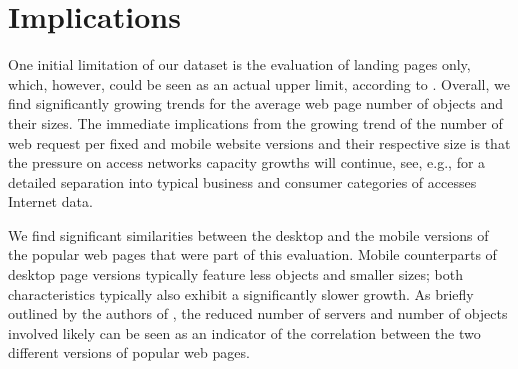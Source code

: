 \documentclass[onecolumn,12pt]{IEEEtran}
\begin{document}
\section{Implications}
\label{s:discuss}
One initial limitation of our dataset is the evaluation of landing pages only, which, however, could be seen as an actual upper limit, according to \cite{BuMaSe13}. 
Overall, we find significantly growing trends for the average web page number of objects and their sizes.
The immediate implications from the growing trend of the number of web request per fixed and mobile website versions and their respective size is that the pressure on access networks capacity growths will continue, see, e.g., \cite{Ci13} for a detailed separation into typical business and consumer categories of accesses Internet data.

We find significant similarities between the desktop and the mobile versions of the popular web pages that were part of this evaluation. 
Mobile counterparts of desktop page versions typically feature less objects and smaller sizes; both characteristics typically also exhibit a significantly slower growth.
As briefly outlined by the authors of \cite{BuMaSe13}, the reduced number of servers and number of objects involved likely can be seen as an indicator of the correlation between the two different versions of popular web pages.
\end{document}
